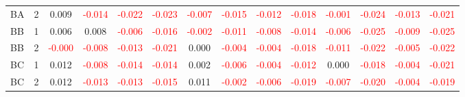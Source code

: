 \begin{table}[!htb]
{\begin{tabular}{llcccccccccccc}
BA & 2 & 0.009 & \textcolor{red}{-0.014} & \textcolor{red}{-0.022} & \textcolor{red}{-0.023} & \textcolor{red}{-0.007} & \textcolor{red}{-0.015} & \textcolor{red}{-0.012} & \textcolor{red}{-0.018} & \textcolor{red}{-0.001} & \textcolor{red}{-0.024} & \textcolor{red}{-0.013} & \textcolor{red}{-0.021}\\
BB & 1 & 0.006 & 0.008 & \textcolor{red}{-0.006} & \textcolor{red}{-0.016} & \textcolor{red}{-0.002} & \textcolor{red}{-0.011} & \textcolor{red}{-0.008} & \textcolor{red}{-0.014} & \textcolor{red}{-0.006} & \textcolor{red}{-0.025} & \textcolor{red}{-0.009} & \textcolor{red}{-0.025}\\
BB & 2 & \textcolor{red}{-0.000} & \textcolor{red}{-0.008} & \textcolor{red}{-0.013} & \textcolor{red}{-0.021} & 0.000 & \textcolor{red}{-0.004} & \textcolor{red}{-0.004} & \textcolor{red}{-0.018} & \textcolor{red}{-0.011} & \textcolor{red}{-0.022} & \textcolor{red}{-0.005} & \textcolor{red}{-0.022}\\
BC & 1 & 0.012 & \textcolor{red}{-0.008} & \textcolor{red}{-0.014} & \textcolor{red}{-0.014} & 0.002 & \textcolor{red}{-0.006} & \textcolor{red}{-0.004} & \textcolor{red}{-0.012} & 0.000 & \textcolor{red}{-0.018} & \textcolor{red}{-0.004} & \textcolor{red}{-0.021}\\
BC & 2 & 0.012 & \textcolor{red}{-0.013} & \textcolor{red}{-0.013} & \textcolor{red}{-0.015} & 0.011 & \textcolor{red}{-0.002} & \textcolor{red}{-0.006} & \textcolor{red}{-0.019} & \textcolor{red}{-0.007} & \textcolor{red}{-0.020} & \textcolor{red}{-0.004} & \textcolor{red}{-0.019}\\
\hline
    \end{tabular}%
    }
\end{table}

